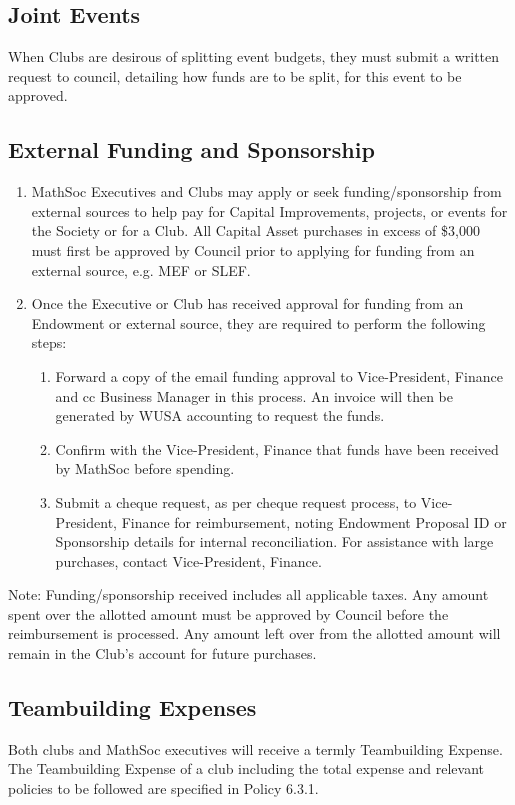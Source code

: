 \subsection{Joint Events}
When Clubs are desirous of splitting event budgets, they must submit a written request to council, detailing how funds are to be split, for this event to be approved.

\subsection{External Funding and Sponsorship}
\begin{enumerate}
    \item MathSoc Executives and Clubs may apply or seek funding/sponsorship from external sources to help pay for Capital Improvements, projects, or events for the Society or for a Club. All Capital Asset purchases in excess of \$3,000 must first be approved by Council prior to applying for funding from an external source, e.g. MEF or SLEF.
    \item Once the Executive or Club has received approval for funding from an Endowment or external source, they are required to perform the following steps:
    \begin{enumerate}
        \item Forward a copy of the email funding approval to Vice-President, Finance and cc Business Manager in this process. An invoice will then be generated by WUSA accounting to request the funds.
        \item Confirm with the Vice-President, Finance that funds have been received by MathSoc before spending. 
        \item Submit a cheque request, as per cheque request process, to Vice-President, Finance for reimbursement, noting Endowment Proposal ID or Sponsorship details for internal reconciliation. For assistance with large purchases, contact Vice-President, Finance.
    \end{enumerate}
\end{enumerate}
Note: Funding/sponsorship received includes all applicable taxes. Any amount spent over the allotted amount must be approved by Council before the reimbursement is processed. Any amount left over from the allotted amount will remain in the Club's account for future purchases.

\subsection{Teambuilding Expenses}
Both clubs and MathSoc executives will receive a termly Teambuilding Expense. The Teambuilding Expense of a club including the total expense and relevant policies to be followed are specified in Policy 6.3.1.


